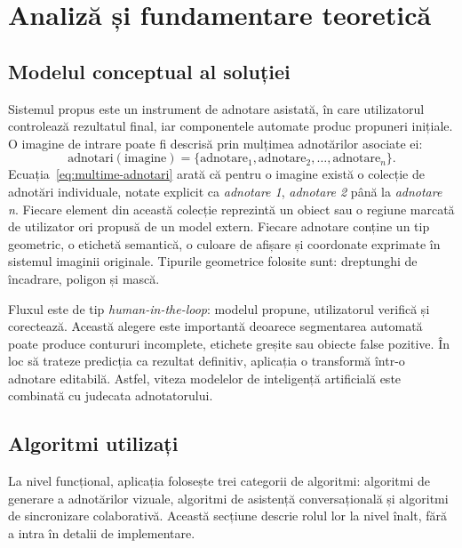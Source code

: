 \chapter{Analiză și fundamentare teoretică}
\label{ch:analysis}
\pagestyle{fancy}

\section{Modelul conceptual al soluției}
\label{sec:model-conceptual-solutie}

Sistemul propus este un instrument de adnotare asistată, în care utilizatorul controlează rezultatul final, iar componentele automate produc propuneri inițiale.
O imagine de intrare poate fi descrisă prin mulțimea adnotărilor asociate ei:
\begin{equation}
    \text{adnotari}(\text{imagine}) =
    \{\text{adnotare}_1, \text{adnotare}_2, \ldots, \text{adnotare}_n\}.
    \label{eq:multime-adnotari}
\end{equation}
Ecuația~\ref{eq:multime-adnotari} arată că pentru o imagine există o colecție de adnotări individuale, notate explicit ca \textit{adnotare 1}, \textit{adnotare 2} până la \textit{adnotare n}. Fiecare element din această colecție reprezintă un obiect sau o regiune marcată de utilizator ori propusă de un model extern.
Fiecare adnotare conține un tip geometric, o etichetă semantică, o culoare de afișare și coordonate exprimate în sistemul imaginii originale.
Tipurile geometrice folosite sunt: dreptunghi de încadrare, poligon și mască.

Fluxul este de tip \textit{human-in-the-loop}: modelul propune, utilizatorul verifică și corectează.
Această alegere este importantă deoarece segmentarea automată poate produce contururi incomplete, etichete greșite sau obiecte false pozitive.
În loc să trateze predicția ca rezultat definitiv, aplicația o transformă într-o adnotare editabilă.
Astfel, viteza modelelor de inteligență artificială este combinată cu judecata adnotatorului.

\section{Algoritmi utilizați}
\label{sec:algoritmi-utilizati}

La nivel funcțional, aplicația folosește trei categorii de algoritmi: algoritmi de generare a adnotărilor vizuale, algoritmi de asistență conversațională și algoritmi de sincronizare colaborativă.
Această secțiune descrie rolul lor la nivel înalt, fără a intra în detalii de implementare.

